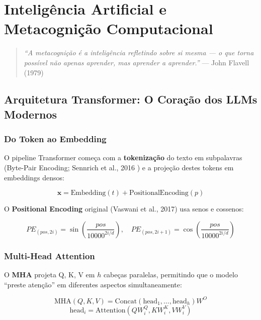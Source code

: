 \chapter{Inteligência Artificial e Metacognição Computacional}

\begin{quote}
\textit{``A metacognição é a inteligência refletindo sobre si mesma — o que torna possível não apenas aprender, mas aprender a aprender.''} --- John Flavell (1979)
\end{quote}

\section{Arquitetura Transformer: O Coração dos LLMs Modernos}

\subsection{Do Token ao Embedding}

O pipeline Transformer começa com a \textbf{tokenização} do texto em subpalavras (Byte-Pair Encoding; Sennrich et al., 2016 \cite{sennrich2016neural}) e a projeção destes tokens em embeddings densos:

\begin{equation}
\mathbf{x} = \text{Embedding}(t) + \text{PositionalEncoding}(p)
\label{eq:transformer_input}
\end{equation}

O \textbf{Positional Encoding} original (Vaswani et al., 2017) usa senos e cossenos:

\begin{equation}
PE_{(pos, 2i)} = \sin\left(\frac{pos}{10000^{2i/d}}\right), \quad PE_{(pos, 2i+1)} = \cos\left(\frac{pos}{10000^{2i/d}}\right)
\label{eq:positional_encoding}
\end{equation}

\subsection{Multi-Head Attention}

O \textbf{MHA} projeta Q, K, V em $h$ cabeças paralelas, permitindo que o modelo ``preste atenção'' em diferentes aspectos simultaneamente:

\begin{equation}
\text{MHA}(Q, K, V) = \text{Concat}(\text{head}_1, \ldots, \text{head}_h) W^O
\label{eq:mha}
\end{equation}
\begin{equation}
\text{head}_i = \text{Attention}(QW_i^Q, KW_i^K, VW_i^V)
\label{eq:mha_head}
\end{equation}

